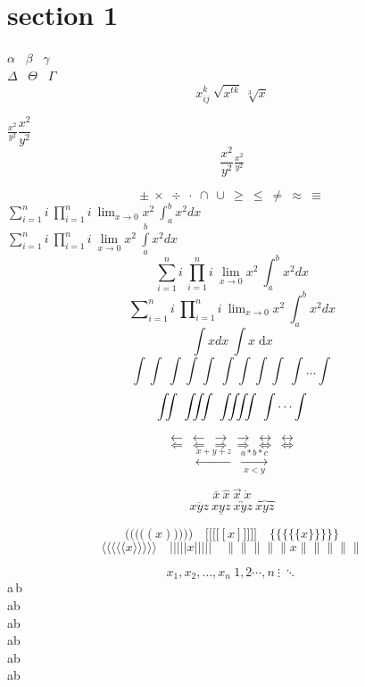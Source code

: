 \documentclass[12pt]{article}
\begin{document}
    \section{section 1}
    $\alpha$ \ $\beta$ \ $\gamma$ \\    %
    $\Delta$ \ $\Theta$ \ $\Gamma$ \\   %
    
    \[ x_{ij}^k \ \sqrt{x^{tk}} \ \sqrt[3]{x} \]
    
    $ \frac{x^2}{y^2} \dfrac{x^2}{y^2} $
    \[ \frac{x^2}{y^2}
        \tfrac{x^2}{y^2} \]
        
    \[ \pm \ \times \ \div \ \cdot \ \cap \ \cup \
        \geq \ \leq \ \neq \ \approx \ \equiv \]
    $ \sum_{i=1}^n i \        \prod_{i=1}^n i \  \lim_{x\to0}x^2 \ \int_a^b x^2 dx  $ \\
    $ \sum\limits_{i=1}^n i \ \prod\limits_{i=1}^n i \ \lim\limits_{x\to0}x^2 \ \int\limits_a^b x^2 dx $
    \[ \sum_{i=1}^n i \        \prod_{i=1}^n i \  \lim_{x\to0}x^2 \ \int_a^b x^2 dx  \]
     \[\sum\nolimits_{i=1}^n i \ \prod\nolimits_{i=1}^n i \ \lim\nolimits_{x\to0}x^2 \ \int\nolimits_a^b x^2 dx \]
    \newcommand{\myd}{\;\mathrm{d}}
    \[ \int x dx \ \int x \myd x \]
    \[ \int\int \ \int\int\int \ \int\int\int\int \ \int\dots\int \]    %
    \[ \iint \ \iiint \ \iiiint \ \idotsint \]  %
    
    \[ \leftarrow \ \longleftarrow \ \rightarrow \ \longrightarrow \ \leftrightarrow \ \longleftrightarrow \]
    \[ \Leftarrow \ \Longleftarrow \ \Rightarrow \ \Longrightarrow \ \Leftrightarrow \ \Longleftrightarrow \]
    \[ \xleftarrow{x+y+z} \ \xrightarrow[x<y]{a*b*c} \]
    
    \[ \bar{x} \ \hat{x} \ \vec{x} \ \dot{x} \]
    \[ \overline{xyz} \ \underline{xyz} \ \overleftrightarrow{xyz} \ \overbrace{xyz} \]
    
    \[ \Bigg(\bigg(\Big(\big((x)\big)\Big)\bigg)\Bigg)\quad
    \Bigg[\bigg[\Big[\big[[x]\big]\Big]\bigg]\Bigg]\quad
    \Bigg\{\bigg\{\Big\{\big\{\{x\}\big\}\Big\}\bigg\}\Bigg\}
    \]
    \[\Bigg\langle\bigg\langle\Big\langle\big\langle\langle x
    \rangle\big\rangle\Big\rangle\bigg\rangle\Bigg\rangle\quad
    \Bigg\lvert\bigg\lvert\Big\lvert\big\lvert\lvert x
    \rvert\big\rvert\Big\rvert\bigg\rvert\Bigg\rvert\quad
    \Bigg\lVert\bigg\lVert\Big\lVert\big\lVert\lVert x
    \rVert\big\rVert\Big\rVert\bigg\rVert\Bigg\rVert 
    \]
    
    \[ x_1,x_2,\dots,x_n \ 1,2\cdots,n \ \vdots \ \ddots \]
     a\,b \\ a\:b \\ a\;b \\ a\quad b \\ a\qquad b \\ a\!b 
    
\end{document}
